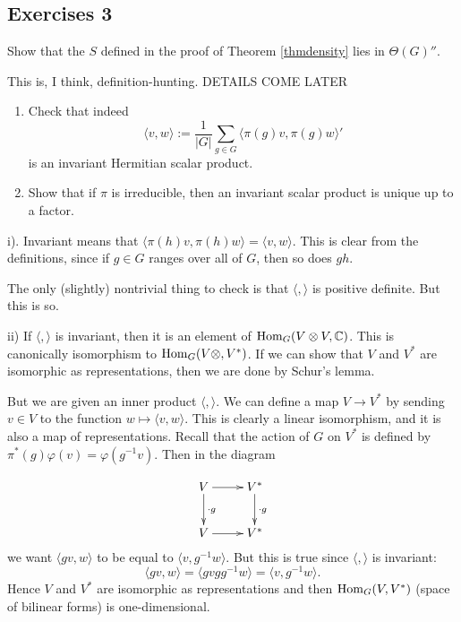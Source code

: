 \documentclass[11pt, english]{article}
\begin{document}
\subsection{Exercises 3}

\begin{exc}
Show that the $S$ defined in the proof of Theorem \eqref{thmdensity} lies in $\Theta(G)''$.
\end{exc}
\begin{sol}
 This is, I think, definition-hunting. DETAILS COME LATER
\end{sol}

\begin{exc}
  \begin{enumerate}
  \item Check that indeed 
$$
\langle v, w \rangle := \frac{1}{\lvert G \rvert} \sum_{g \in G} \langle \pi(g) v, \pi(g) w \rangle'
$$
is an invariant Hermitian scalar product.
\item Show that if $\pi$ is irreducible, then an invariant scalar product is unique up to a factor.
  \end{enumerate}
\end{exc}

\begin{sol}
i). Invariant means that $\langle \pi(h) v, \pi(h) w \rangle = \langle v, w \rangle $. This is clear from the definitions, since if $g \in G$ ranges over all of $G$, then so does $gh$.

The only (slightly) nontrivial thing to check is that $\langle,\rangle$ is positive definite. But this is so.


ii) If $\langle,\rangle$ is invariant, then it is an element of $\operatorname{Hom}_G(V \otimes V, \mathbb{C})$. This is canonically isomorphism to $\operatorname{Hom}_G(V \otimes, V^\ast)$. If we can show that $V$ and $V^\ast$ are isomorphic as representations, then we are done by Schur's lemma. 

But we are given an inner product $\langle , \rangle$. We can define a map $V \to V^\ast$ by sending $v \in V$ to the function $w \mapsto \langle v, w \rangle$. This is clearly a linear isomorphism, and it is also a map of representations. Recall that the action of $G$ on $V^\ast$ is defined by $\pi^\ast(g) \varphi (v) = \varphi(g^{-1} v)$. Then in the diagram

$$
\xymatrix{
V \ar[r] \ar[d]^{\cdot g} & V^\ast \ar[d]^{\cdot g} \\
V \ar[r]  & V^\ast 
}
$$
we want $\langle gv, w \rangle$ to be equal to $\langle v, g^{-1} w \rangle$. But this is true since $\langle ,\rangle$ is invariant:
$$
\langle gv, w \rangle = \langle gv g g^{-1} w \rangle = \langle v, g^{-1}w \rangle.
$$
Hence $V$ and $V^\ast$ are isomorphic as representations and then $\operatorname{Hom}_G(V,V^\ast)$ (space of bilinear forms) is one-dimensional. 
\end{sol}
\end{document}
